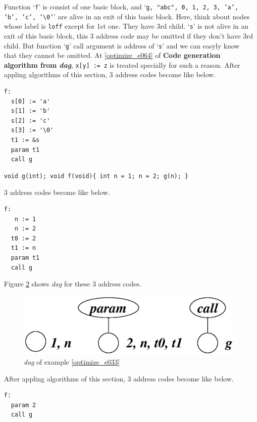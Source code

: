 \begin{Example}
\begin{figure}[htbp]
\begin{center}
\label{optimize_e032}
\end{center}
\end{figure}
Function `{\tt{f}}' is consist of one basic block, and 
`{\tt{g, "abc", 0, 1, 2, 3, 'a', 'b', 'c', '\verb|\|0'}}'
are alive in an exit of this basic block.
Here, think about nodes whose label is {\tt{loff}} except for 1st one.
They have 3rd child.
`{\tt{s}}' is not alive in an exit of this basic block,
this 3 address code may be omitted if they don't have 3rd child.
But function `{\tt{g}}' call argument is address of `{\tt{s}}'
and we can easyly know that they cannot be omitted.
At \ref{optimize_e064} of {\bf Code generation algorithm from {\em dag}},
{\tt{x[y] := z}} is treated specially for such a reason.
After appling algorithms of this section,
3 address codes become like below.
\begin{verbatim}
f:
  s[0] := 'a'
  s[1] := 'b'
  s[2] := 'c'
  s[3] := '\0'
  t1 := &s
  param t1
  call g
\end{verbatim}
\end{Example}

\begin{Example}
\label{optimize_e033}
\begin{verbatim}
void g(int); void f(void){ int n = 1; n = 2; g(n); }
\end{verbatim}
3 address codes become like below.
\begin{verbatim}
f:
   n := 1
   n := 2
  t0 := 2
  t1 := n
  param t1
  call g
\end{verbatim}
Figure \ref{optimize_e034} shows {\em dag} for these 3 address codes.
\begin{figure}[htbp]
\begin{center}
\includegraphics[width=0.8\linewidth,height=0.247\linewidth]{opt018.eps}
\caption{{\em dag} of example \ref{optimize_e033}}
\label{optimize_e034}
\end{center}
\end{figure}
After appling algorithms of this section,
3 address codes become like below.
\begin{verbatim}
f:
  param 2
  call g
\end{verbatim}
\end{Example}

